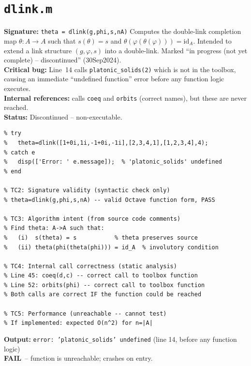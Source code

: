 \documentclass[12pt,a4paper]{report}
\newcommand{\mf}[1]{\texttt{#1}}
\newcommand{\FAIL}{\textcolor{red!70!black}{\textbf{FAIL}}}
\begin{document}
\chapter{\mf{dlink.m}}
\begin{tcolorbox}[Abox,title=Analysis]
\textbf{Signature:} \lstinline|theta = dlink(g,phi,s,nA)|\quad
Computes the double-link completion map $\theta:A\to A$ such that $s(\theta)=s$ and $\theta(\varphi(\theta(\varphi)))=\mathrm{id}_A$. Intended to extend a link structure $(g,\varphi,s)$ into a double-link. Marked ``in progress (not yet complete) -- discontinued'' (30Sep2024).\\[4pt]
\textbf{Critical bug:} Line~14 calls \mf{platonic\_solids(2)} which is not in the toolbox, causing an immediate ``undefined function'' error before any function logic executes.\\[4pt]
\textbf{Internal references:} calls \mf{coeq} and \mf{orbits} (correct names), but these are never reached.\\[4pt]
\textbf{Status:} Discontinued -- non-executable.
\end{tcolorbox}
\begin{lstlisting}[caption={Tests for dlink.m (static analysis + dependency check)}]
% TC1: Calling raises error due to undefined dependency
% try
%   theta=dlink([1+0i,1i,-1+0i,-1i],[2,3,4,1],[1,2,3,4],4);
% catch e
%   disp(['Error: ' e.message]);  % 'platonic_solids' undefined
% end

% TC2: Signature validity (syntactic check only)
% theta=dlink(g,phi,s,nA) -- valid Octave function form, PASS

% TC3: Algorithm intent (from source code comments)
% Find theta: A->A such that:
%   (i)  s(theta) = s           % theta preserves source
%   (ii) theta(phi(theta(phi))) = id_A  % involutory condition

% TC4: Internal call correctness (static analysis)
% Line 45: coeq(d,c) -- correct call to toolbox function
% Line 52: orbits(phi) -- correct call to toolbox function
% Both calls are correct IF the function could be reached

% TC5: Performance (unreachable -- cannot test)
% If implemented: expected O(n^2) for n=|A|
\end{lstlisting}
\begin{tcolorbox}[Fbox,title=TC1 -- Undefined dependency]
\textbf{Output:} \texttt{error: 'platonic\_solids' undefined} (line 14, before any function logic)\\
\FAIL\ -- function is unreachable; crashes on entry.
\end{tcolorbox}
\end{document}
